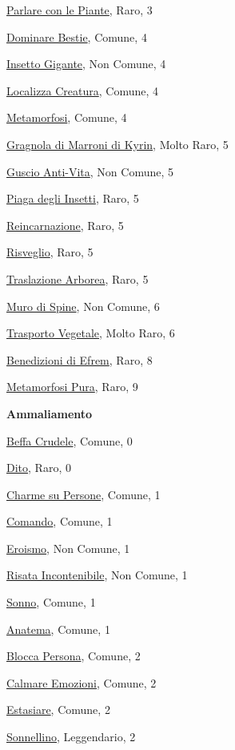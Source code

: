\begin{multicols}{3}
{{\hyperlink{Parlare con le Piante}{Parlare con le Piante}, Raro, 3

\hyperlink{Dominare Bestie}{Dominare Bestie}, Comune, 4

\hyperlink{Insetto Gigante}{Insetto Gigante}, Non Comune, 4

\hyperlink{Localizza Creatura}{Localizza Creatura}, Comune, 4

\hyperlink{Metamorfosi}{Metamorfosi}, Comune, 4

\hyperlink{Gragnola di Marroni di Kyrin}{Gragnola di Marroni di Kyrin}, Molto Raro, 5

\hyperlink{Guscio Anti-Vita}{Guscio Anti-Vita}, Non Comune, 5

\hyperlink{Piaga degli Insetti}{Piaga degli Insetti}, Raro, 5

\hyperlink{Reincarnazione}{Reincarnazione}, Raro, 5

\hyperlink{Risveglio}{Risveglio}, Raro, 5

\hyperlink{Traslazione Arborea}{Traslazione Arborea}, Raro, 5

\hyperlink{Muro di Spine}{Muro di Spine}, Non Comune, 6

\hyperlink{Trasporto Vegetale}{Trasporto Vegetale}, Molto Raro, 6

\hyperlink{Benedizioni di Efrem}{Benedizioni di Efrem}, Raro, 8

\hyperlink{Metamorfosi Pura}{Metamorfosi Pura}, Raro, 9

\medskip\textbf{Ammaliamento}

\hyperlink{Beffa Crudele}{Beffa Crudele}, Comune, 0

\hyperlink{Dito}{Dito}, Raro, 0

\hyperlink{Charme su Persone}{Charme su Persone}, Comune, 1

\hyperlink{Comando}{Comando}, Comune, 1

\hyperlink{Eroismo}{Eroismo}, Non Comune, 1

\hyperlink{Risata Incontenibile}{Risata Incontenibile}, Non Comune, 1

\hyperlink{Sonno}{Sonno}, Comune, 1

\hyperlink{Anatema}{Anatema}, Comune, 1

\hyperlink{Blocca Persona}{Blocca Persona}, Comune, 2

\hyperlink{Calmare Emozioni}{Calmare Emozioni}, Comune, 2

\hyperlink{Estasiare}{Estasiare}, Comune, 2

\hyperlink{Sonnellino}{Sonnellino}, Leggendario, 2

}}
\end{multicols}
